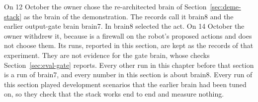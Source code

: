 On 12 October the owner chose the re-architected brain of Section~\ref{sec:deme-stack} as the
brain of the demonstration.
The records call it brain8 and the earlier output-gate brain brain7.
In brain8 \deme{} selected the act. On 14 October the owner withdrew it, because \deme{} is a firewall
on the robot's proposed actions and does not choose them. Its runs, reported in this section, are
kept as the records of that experiment. They are not evidence for the gate brain, whose checks
Section~\ref{sec:eval-gate} reports.
Every other run in this chapter before that section is a run of brain7, and every number in this
section is about brain8.
Every run of this section played development scenarios that the earlier brain had been tuned on,
so they check that the stack works end to end and measure nothing.

